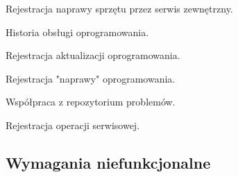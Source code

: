 \begin{myEnumerate}
\begin{myEnumerate}
\begin{myEnumerate}
			\item Rejestracja naprawy sprzętu przez serwis zewnętrzny.
			\end{myEnumerate}
		\item Historia obsługi oprogramowania.
		\begin{myEnumerate}
		\item Rejestracja aktualizacji oprogramowania.
		\item Rejestracja "naprawy" oprogramowania.
		\end{myEnumerate}
		\item Współpraca z repozytorium problemów.
		\begin{myEnumerate}
		\item Rejestracja operacji serwisowej.
		\end{myEnumerate}
	\end{myEnumerate}
\end{myEnumerate}
\subsection{Wymagania niefunkcjonalne}
